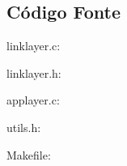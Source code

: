\documentclass[11pt,a4paper,reqno]{article}
\numberwithin{equation}{section}
\begin{document}
\begin{appendices}

\section{Código Fonte}

\begin{Large}
linklayer.c:
\end{Large}



\begin{Large}
linklayer.h:
\end{Large}



\vspace{15mm}

\begin{Large}
applayer.c:
\end{Large}



\vspace{15mm}

\begin{Large}
utils.h:
\end{Large}



\vspace{15mm}

\begin{Large}
Makefile:
\end{Large}



\vspace{15mm}

\end{appendices}
\end{document}
